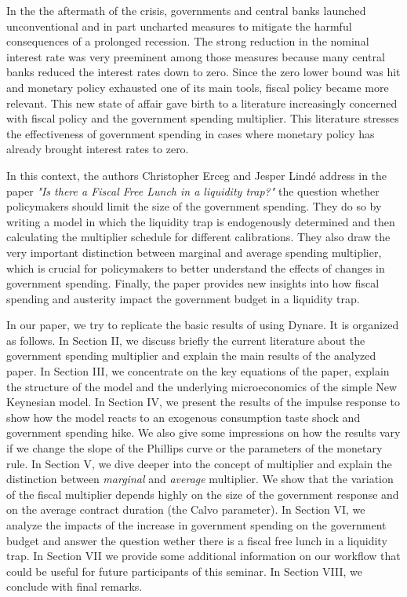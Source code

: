 \documentclass[12pt,a4paper,oneside,titlepage]{article}
\begin{document}
In the the aftermath of the crisis, governments and central banks launched unconventional and in part uncharted measures to mitigate the harmful consequences of a prolonged recession. The strong reduction in the nominal interest rate was very preeminent among those measures because many central banks reduced the interest rates down to zero. Since the zero lower bound was hit and monetary policy exhausted one of its main tools, fiscal policy became more relevant. This new state of affair gave birth to a literature increasingly concerned with fiscal policy and the government spending multiplier. This literature stresses the effectiveness of government spending in cases where monetary policy has already brought interest rates to zero.
\par
\bigskip
In this context, the authors Christopher Erceg and Jesper Lindé address in the paper \textit{"Is there a Fiscal Free Lunch in a liquidity trap?"} the question whether policymakers should limit the size of the government spending. They do so by writing a model in which the liquidity trap is endogenously determined and then calculating the multiplier schedule for different calibrations. They also draw the very important distinction between marginal and average spending multiplier, which is crucial for policymakers to better understand the effects of changes in government spending. Finally, the paper provides new insights into how fiscal spending and austerity impact the government budget in a liquidity trap.

In our paper, we try to replicate the basic results of \citet{Erceg.2014} using Dynare. It is organized as follows. In Section II, we discuss briefly the current literature about the government spending multiplier and explain the main results of the analyzed paper. In Section III, we concentrate on the key equations of the paper, explain the structure of the model and the underlying microeconomics of the simple New Keynesian model. In Section IV, we present the results of the impulse response to show how the model reacts to an exogenous consumption taste shock and government spending hike. We also give some impressions on how the results vary if we change the slope of the Phillips curve or the parameters of the monetary rule. In Section V, we dive deeper into the concept of multiplier and explain the distinction between \textit{marginal} and \textit{average} multiplier. We show that the variation of the fiscal multiplier depends highly on the size of the government response and on the average contract duration (the Calvo parameter). In Section VI, we analyze the impacts of the increase in government spending on the government budget and answer the question wether there is a fiscal free lunch in a liquidity trap. In Section VII we provide some additional information on our workflow that could be useful for future participants of this seminar. In Section VIII, we conclude with final remarks.
\end{document}
